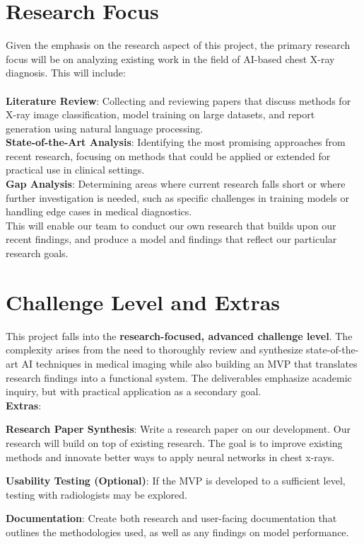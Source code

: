 \documentclass{article}
\begin{document}
\section{Research Focus}
Given the emphasis on the research aspect of this project, the primary research focus will be on analyzing existing work in the field of AI-based chest X-ray diagnosis. This will include:\\\\
\textbf{Literature Review}: Collecting and reviewing papers that discuss methods for X-ray image classification, model training on large datasets, and report generation using natural language processing.\\
\textbf{State-of-the-Art Analysis}: Identifying the most promising approaches from recent research, focusing on methods that could be applied or extended for practical use in clinical settings.\\
\textbf{Gap Analysis}: Determining areas where current research falls short or where further investigation is needed, such as specific challenges in training models or handling edge cases in medical diagnostics.\\

This will enable our team to conduct our own research that builds upon our recent findings, and produce a model and findings that reflect our particular research goals.


\section{Challenge Level and Extras}
This project falls into the \textbf{research-focused, advanced challenge level}. The complexity arises from the need to thoroughly review and synthesize state-of-the-art AI techniques in medical imaging while also building an MVP that translates research findings into a functional system. The deliverables emphasize academic inquiry, but with practical application as a secondary goal.\\

\textbf{Extras}:
\begin{itemize}
\begin{item}
    \textbf{Research Paper Synthesis}: Write a research paper on our development. Our research will build on top of existing research. The goal is to improve existing methods and innovate better ways to apply neural networks in chest x-rays.
\end{item}
\begin{item}
    \textbf{Usability Testing (Optional)}: If the MVP is developed to a sufficient level, testing with radiologists may be explored.
\end{item}
\begin{item}
\textbf{Documentation}: Create both research and user-facing documentation that outlines the methodologies used, as well as any findings on model performance.
\end{item}
\end{itemize}
\end{document}
